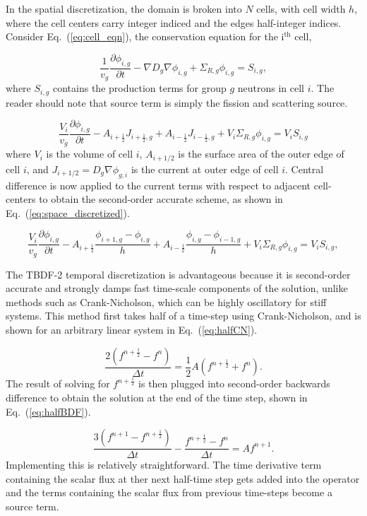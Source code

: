 \documentclass[12pt]{article}
\newcommand{\fn}[1]{\left( #1 \right)}
\newcommand{\dxdt}[1]{\frac{\partial #1}{\partial t}}
\newcommand{\be}{\begin{equation}}
\newcommand{\ee}{\end{equation}}
\newcommand{\LEQ}[1]{\label{eq:#1}}
\newcommand{\EQ}[1]{Eq.~(\ref{eq:#1})}
\newcommand{\half}{\frac{1}{2}}
\begin{document}
In the spatial discretization, the domain is broken into $N$ cells, with cell 
	width $h$, where the cell centers carry integer indiced and the edges 
	half-integer indices. 
Consider \EQ{cell_eqn}, the conservation equation for the i$^{\text{th}}$ cell,

\be
	 \frac{1}{v_g} \dxdt{\phi_{i,g}} - \nabla D_{g} \nabla \phi_{i,g} + 	
	 	\Sigma_{R,g} \phi_{i,g}  =  S_{i,g},
	\LEQ{cell_eqn} 
\ee
where $S_{i,g}$ contains the production terms for group $g$ neutrons in cell 		
	$i$.
The reader should note that source term is simply the fission and scattering 
	source.

\be
	\frac{V_i}{v_g} \dxdt{\phi_{i,g}} - A_{i+\half} J_{i+\half,g} + A_{i-\half} 
		J_{i-\half,g} + V_i \Sigma_{R,g} \phi_{i,g} = V_i S_{i,g}
\ee
where $V_i $ is the volume of cell $i$, $ A_{i+1/2} $ is the surface area of 
	the outer edge of cell $i$, and $ J_{i+1/2} = D_g \nabla \phi_{g,i} $ is the 
	current at outer edge of cell $i$. 
Central difference is now applied to the current terms with respect to adjacent 
	cell-centers to obtain the second-order accurate scheme, as shown in 
	\EQ{space_discretized}.

\be
	\frac{V_i}{v_g} \dxdt{\phi_{i,g}} - A_{i+\half} \frac{\phi_{i+1,g} - 
		\phi_{i,g}}{h} + A_{i-\half} \frac{\phi_{i,g} - \phi_{i-1,g}}{h} + 
		V_i \Sigma_{R,g} \phi_{i,g} = V_i S_{i,g},
 	\LEQ{space_discretized} 
\ee

The TBDF-2 temporal discretization is advantageous because it is second-order 
	accurate and strongly damps fast time-scale components of the solution, 
	unlike methods such as Crank-Nicholson, which can be highly oscillatory for 
	stiff systems. 
This method first takes half of a time-step using Crank-Nicholson, and is shown 
	for an arbitrary linear system in \EQ{halfCN}. 

\be
	\frac{2 \fn{ f^{n+\half} - f^n }}{\Delta t} =  \half A \fn{f^{n+\half} + f^n}.
	\LEQ{halfCN} 
\ee
The result of solving for $f^{n+\half}$ is then plugged into second-order 
	backwards difference to obtain the solution at the end of the time step, 
	shown in \EQ{halfBDF}.

\be
	\frac{3 \fn{ f^{n+1} - f^{n+\half} }}{\Delta t} - \frac{f^{n+\half} - 
		f^n}{\Delta t} = A f^{n+1}.
	\LEQ{halfBDF} 
\ee 
Implementing this is relatively straightforward. 
The time derivative term containing the scalar flux at ther next half-time step 
	gets added into the operator and the terms containing the scalar flux from 
	previous time-steps become a source term.
\end{document}
